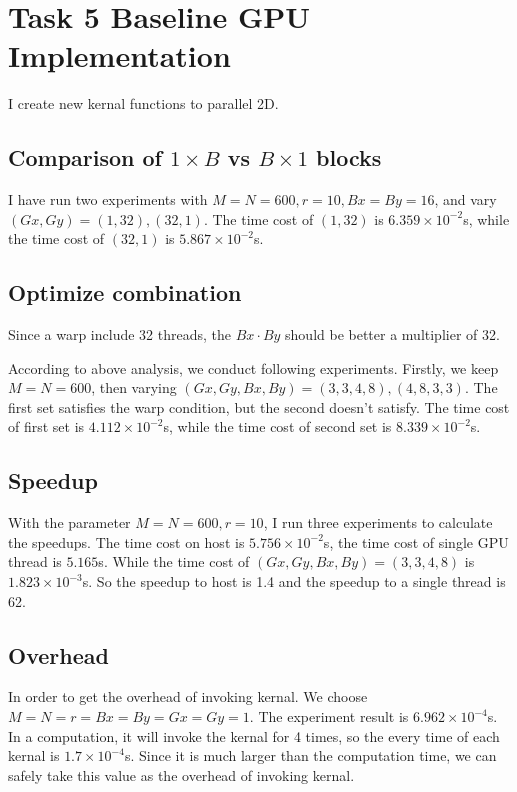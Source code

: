 \section{Task 5 Baseline GPU Implementation}

I create new kernal functions to parallel 2D. 

\subsection{Comparison of $1\times B$ vs $B \times 1$ blocks}
I have run two experiments with $M=N=600, r=10, Bx=By=16$,
and vary $(Gx,Gy) = (1,32), (32,1)$.
The time cost of $(1,32)$ is $6.359 \times 10^{-2}$s,
while the time cost of $(32,1)$ is $5.867 \times 10^{-2}$s.

\subsection{Optimize combination}



Since a warp include 32 threads, the $Bx \cdot By$ should 
be better a multiplier of 32.

According to above analysis, we conduct following experiments.
Firstly, we keep $M=N=600$, then varying 
$(Gx, Gy, Bx,By) = (3,3, 4, 8), (4,8,3,3)$. 
The first set satisfies the warp condition, but the second doesn't satisfy.
The time cost of first set is $4.112\times 10^{-2}$s, while the 
time cost of second set is $8.339\times 10^{-2}$s.

\subsection{Speedup}
With the parameter $M=N=600, r=10$, I run three experiments to calculate the speedups.
The time cost on host is $5.756\times 10^{-2}$s, the time cost of single GPU thread is
$5.165$s. While the time cost of $(Gx, Gy, Bx, By) = (3,3,4,8)$ is $1.823\times 10^{-3}$s.
So the speedup to host is 1.4 and the speedup to a single thread is 62.

\subsection{Overhead}
In order to get the overhead of invoking kernal. We choose $M=N=r=Bx=By=Gx=Gy=1$.
The experiment result is $6.962\times 10^{-4}$s. In a computation, it will invoke
the kernal for 4 times, so the every time of each kernal is $1.7\times 10^{-4}$s. 
Since it is much larger than the computation time, we can safely take this value 
as the overhead of invoking kernal.
